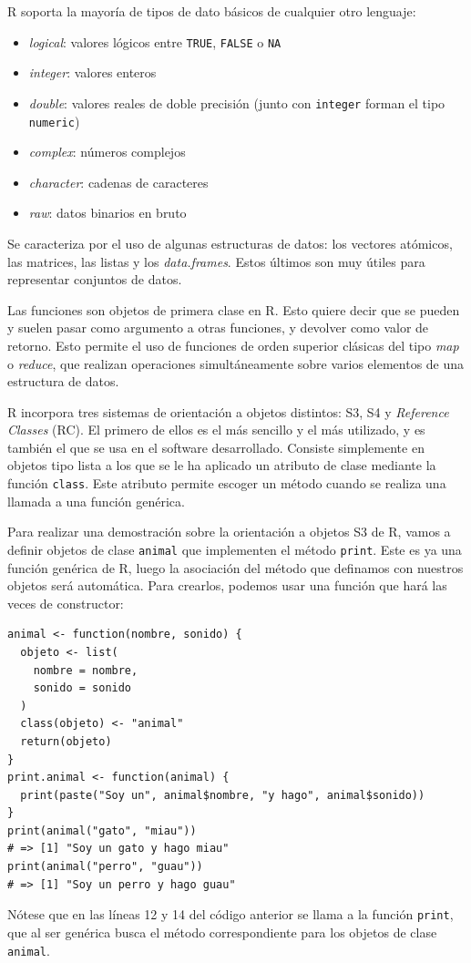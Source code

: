R soporta la mayoría de tipos de dato básicos de cualquier otro lenguaje:
\begin{itemize}
\item \textit{logical}: valores lógicos entre \texttt{TRUE}, \texttt{FALSE} o \texttt{NA}
\item \textit{integer}: valores enteros
\item \textit{double}: valores reales de doble precisión (junto con \texttt{integer} forman el tipo \texttt{numeric})
\item \textit{complex}: números complejos
\item \textit{character}: cadenas de caracteres
\item \textit{raw}: datos binarios en bruto
\end{itemize}

Se caracteriza por el uso de algunas estructuras de datos: los vectores atómicos, las matrices, las listas y los \textit{data.frames}. Estos últimos son muy útiles para representar conjuntos de datos.

Las funciones son objetos de primera clase en R. Esto quiere decir que se pueden y suelen pasar como argumento a otras funciones, y devolver como valor de retorno. Esto permite el uso de funciones de orden superior clásicas del tipo \textit{map} o \textit{reduce}, que realizan operaciones simultáneamente sobre varios elementos de una estructura de datos.

R incorpora tres sistemas de orientación a objetos distintos: S3, S4 y \textit{Reference Classes} (RC). El primero de ellos es el más sencillo y el más utilizado, y es también el que se usa en el software desarrollado. Consiste simplemente en objetos tipo lista a los que se le ha aplicado un atributo de clase mediante la función \texttt{class}. Este atributo permite escoger un método cuando se realiza una llamada a una función genérica.

\begin{example}
  Para realizar una demostración sobre la orientación a objetos S3 de R, vamos a definir objetos de clase \texttt{animal} que implementen el método \texttt{print}. Este es ya una función genérica de R, luego la asociación del método que definamos con nuestros objetos será automática. Para crearlos, podemos usar una función que hará las veces de constructor:
  \begin{lstlisting}
animal <- function(nombre, sonido) {
  objeto <- list(
    nombre = nombre,
    sonido = sonido
  )
  class(objeto) <- "animal"
  return(objeto)
}
print.animal <- function(animal) {
  print(paste("Soy un", animal$nombre, "y hago", animal$sonido))
}
print(animal("gato", "miau"))
# => [1] "Soy un gato y hago miau"
print(animal("perro", "guau"))
# => [1] "Soy un perro y hago guau"
\end{lstlisting}

Nótese que en las líneas 12 y 14 del código anterior se llama a la función \texttt{print}, que al ser genérica busca el método correspondiente para los objetos de clase \texttt{animal}.
\end{example}

